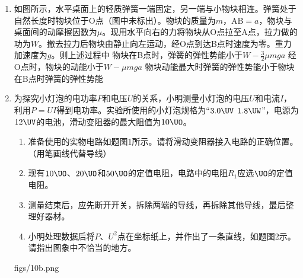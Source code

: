 \documentclass[\gkver]{gaokaozhenti}
\begin{document}
\begin{enumerate}
\item
如图所示，水平桌面上的轻质弹簧一端固定，另一端与小物块相连。弹簧处于自然长度时物块位于O点（图中未标出）。物块的质量为$m$，AB$=a$，物块与桌面间的动摩擦因数为$\mu$。现用水平向右的力将物块从O点拉至A点，拉力做的功为$W$。撤去拉力后物块由静止向左运动，经O点到达B点时速度为零。重力加速度为$g$。则上述过程中
{物块在B点时，弹簧的弹性势能小于$W-\frac{3}{2}\mu mga$}
{经O点时，物块的动能小于$W-\mu mga$}
{物块动能最大时弹簧的弹性势能小于物块在B点时弹簧的弹性势能}

\item
为探究小灯泡的电功率$P$和电压$U$的关系，小明测量小灯泡的电压$U$和电流$I$，利用$P=UI$得到电功率。实验所使用的小灯泡规格为“$3.0\UV$ $1.8\UW$”，电源为$12\UV$的电池，滑动变阻器的最大阻值为$10\UO$。
\begin{enumerate}
	\item
	准备使用的实物电路如题图1所示。请将滑动变阻器接入电路的正确位置。（用笔画线代替导线）
	\item
	现有$10\UO$、$20\UO$和$50\UO$的定值电阻，电路中的电阻$R_{1}$应选$\UO$的定值电阻。
	\item
	测量结束后，应先断开开关，拆除两端的导线，再拆除其他导线，最后整理好器材。
	\item
	小明处理数据后将$P$、$U^{2}$点在坐标纸上，并作出了一条直线，如题图2示。请指出图象中不恰当的地方。
\end{enumerate}
{figs/10b.png}


\end{enumerate}
\end{document}
